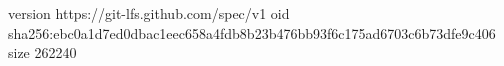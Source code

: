 version https://git-lfs.github.com/spec/v1
oid sha256:ebc0a1d7ed0dbac1eec658a4fdb8b23b476bb93f6c175ad6703c6b73dfe9c406
size 262240

